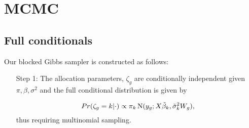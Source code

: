 \section{MCMC}
\label{sec:mcmc}
\subsection{Full conditionals}
\label{subsec:full-cond}
Our blocked Gibbs sampler is constructed as follows:
\begin{enumerate}
\item[Step 1:]
The allocation parameters, $\zeta_g$ are conditionally independent given $\pi, \beta, \sigma^2$ and the full conditional distribution is given by

\begin{equation}
\label{zetafull}
Pr(\zeta_g=k|\cdot) \propto \pi_k \operatorname{N}(y_g;X\tilde{\beta}_k,\tilde{\sigma}_k^2 W_g),
\end{equation}
thus requiring multinomial sampling.


\end{enumerate}
